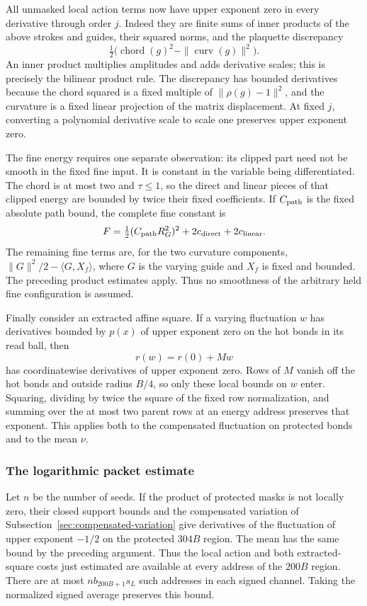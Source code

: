 All unmasked local action terms now have upper exponent zero in
every derivative through order $j$. Indeed they are finite sums
of inner products of the above strokes and guides, their squared
norms, and the plaquette discrepancy
\[
 \tfrac12\bigl(\operatorname{chord}(g)^2
                                  -\|\operatorname{curv}(g)\|^2\bigr).
\]
An inner product multiplies amplitudes and adds derivative scales;
this is precisely the bilinear product rule. The discrepancy has
bounded derivatives because the chord squared is a fixed multiple
of $\|\rho(g)-1\|^2$, and the curvature is a fixed linear
projection of the matrix displacement. At fixed $j$, converting
a polynomial derivative scale to scale one preserves upper
exponent zero.

The fine energy requires one separate observation: its clipped
part need not be smooth in the fixed fine input. It is constant
in the variable being differentiated. The chord is at most two
and $\tau\le1$, so the direct and linear pieces of that clipped
energy are bounded by twice their fixed coefficients. If $C_{\rm path}$
is the fixed absolute path bound, the complete fine constant is
\[
 F=\tfrac12(C_{\rm path}R_G^2)^2
                   +2c_{\rm direct}+2c_{\rm linear}.
\]
The remaining fine terms are, for the
two curvature components, $\|G\|^2/2-\langle G,X_f\rangle$,
where $G$ is the varying guide and $X_f$ is fixed and bounded.
The preceding product estimates apply. Thus no smoothness of the
arbitrary held fine configuration is assumed.

Finally consider an extracted affine square. If a varying
fluctuation $w$ has derivatives bounded by $p(x)$ of upper
exponent zero on the hot bonds in its read ball, then
\[
 r(w)=r(0)+Mw
\]
has coordinatewise derivatives of upper exponent zero. Rows of $M$
vanish off the hot bonds and outside radius $B/4$, so only these
local bounds on $w$ enter. Squaring, dividing by twice the square
of the fixed row normalization, and summing over the at most two
parent rows at an energy address preserves that exponent. This
applies both to the compensated fluctuation on protected bonds
and to the mean $\nu$.

\subsubsection{The logarithmic packet estimate}
Let $n$ be the number of seeds. If the product of protected masks
is not locally zero, their closed support bounds and the compensated
variation of Subsection~\ref{sec:compensated-variation} give derivatives
of the fluctuation of upper exponent $-1/2$ on the protected
$304B$ region. The mean has the same bound by the preceding
argument. Thus the local action and both extracted-square costs
just estimated are available at every address of the $200B$
region. There are at most
$n b_{200B+1}s_L$ such addresses in each signed channel.
Taking the normalized signed average preserves this bound.

